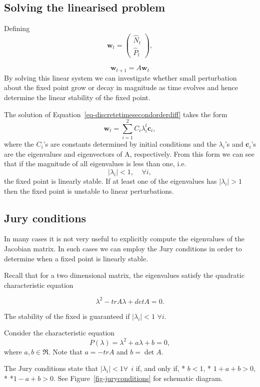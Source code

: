\documentclass[
  letterpaper,
  DIV=11,
  numbers=noendperiod]{scrreprt}
\begin{document}
\hypertarget{solving-the-linearised-problem}{%
\subsection{Solving the linearised
problem}\label{solving-the-linearised-problem}}

Defining \[
\mathbf{w}_t=\left(\begin{array}{c}\hat{N}_{t} \\ \hat{P}_{t}\end{array}\right), 
\]

\[
\mathbf{w}_{t+1}=A\mathbf{w}_{t}
\] By solving this linear system we can investigate whether small
perturbation about the fixed point grow or decay in magnitude as time
evolves and hence determine the linear stability of the fixed point.

The solution of Equation~\ref{eq-discretetimesecondorderdiff} takes the
form \[
\mathbf{w}_t=\sum_{i=1}^2 C_i \lambda_i^t\mathbf{c}_i,
\] where the \(C_i\)'s are constants determined by initial conditions
and the \(\lambda_i\)'s and \(\mathbf{c}_i\)'s are the eigenvalues and
eigenvectors of A, respectively. From this form we can see that if the
magnitude of all eigenvalues is less than one, i.e. \[
|\lambda_i|<1, \ \ \ \ \ \forall i,
\] the fixed point is linearly stable. If at least one of the
eigenvalues has \(|\lambda_i|>1\) then the fixed point is unstable to
linear perturbations.

\hypertarget{jury-conditions}{%
\subsection{Jury conditions}\label{jury-conditions}}

In many cases it is not very useful to explicitly compute the
eigenvalues of the Jacobian matrix. In such cases we can employ the Jury
conditions in order to determine when a fixed point is linearly stable.

Recall that for a two dimensional matrix, the eigenvalues satisfy the
quadratic characteristic equation

\[
\lambda^2- trA \lambda + detA=0.
\]

The stability of the fixed is guaranteed if \(|\lambda _i|<1\)
\(\forall i\).

Consider the characteristic equation \[
P(\lambda)=\lambda^2 + a \lambda +b=0,
\] where \(a,b \in \Re\). Note that \(a=-tr{A}\) and \(b=\det{A}\).

The Jury conditions state that \(|\lambda_i |<1 \forall \ \  i\) if, and
only if, * \(b<1\), * \(1+a+b>0\), * *\(1-a+b>0\). See
Figure~\ref{fig-juryconditions} for schematic diagram.
\end{document}

